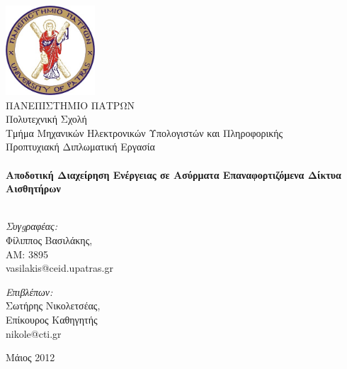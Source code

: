 
\begin{titlingpage}
\begin{center}

\includegraphics[width=0.25\textwidth]{images/upatras_logo.jpg}\\[1cm]

\HUGE 	ΠΑΝΕΠΙΣΤΗΜΙΟ ΠΑΤΡΩΝ\\
\LARGE	Πολυτεχνική Σχολή\\
\Huge	Τμήμα Μηχανικών Ηλεκτρονικών Υπολογιστών και Πληροφορικής\\[1.5cm]

\LARGE Προπτυχιακή Διπλωματική Εργασία\\[0.1cm]


\HRule \\[0.4cm]
{ \HUGE \bfseries Αποδοτική Διαχείρηση Ενέργειας σε Ασύρματα Επαναφορτιζόμενα Δίκτυα Αισθητήρων}\\[0.4cm]

\HRule \\[0.5cm]

\begin{minipage}{0.4\textwidth}
\begin{flushleft} \large
\emph{Συγgραφέας:}\\
Φίλιππος Βασιλάκης, \\AM: 3895\\ vasilakis@ceid.upatras.gr
\end{flushleft}
\end{minipage}
\begin{minipage}{0.4\textwidth}
\begin{flushright} \large
\emph{Επιβλέπων:} \\
Σωτήρης Νικολετσέας, \\Επίκουρος Καθηγητής\\ nikole@cti.gr
\end{flushright}
\end{minipage}

\vfill

{\large Μάιος 2012}

\end{center}

\end{titlingpage}


